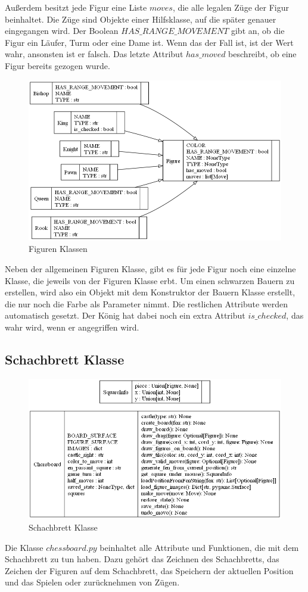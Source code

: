 Außerdem besitzt jede Figur eine Liste \(moves\), die alle legalen Züge der Figur beinhaltet. Die Züge sind Objekte einer Hilfsklasse, auf die später 
genauer eingegangen wird. Der Boolean \(HAS\_RANGE\_MOVEMENT\) gibt an, ob die Figur ein Läufer, Turm oder eine Dame ist. Wenn das der Fall ist,
ist der Wert wahr, ansonsten ist er falsch. Das letzte Attribut \(has\_moved\) beschreibt, ob eine Figur bereits gezogen wurde.
\begin{figure}[ht]
    \centering
    \includegraphics[scale=0.6]{images/classes_figures.png}
    \caption{Figuren Klassen}
\end{figure}
Neben der allgemeinen Figuren Klasse, gibt es für jede Figur noch eine einzelne Klasse, die jeweils von der Figuren Klasse erbt.
Um einen schwarzen Bauern zu erstellen, wird also ein Objekt mit dem Konstruktor der Bauern Klasse erstellt, die nur noch die Farbe als Parameter nimmt.
Die restlichen Attribute werden automatisch gesetzt. Der König hat dabei noch ein extra Attribut \(is\_checked\), das wahr wird, wenn er angegriffen wird.

\subsection{Schachbrett Klasse}
\begin{figure}[ht]
    \centering
    \includegraphics[scale=0.6]{images/classes_chessboard.png}
    \caption{Schachbrett Klasse}
\end{figure}
Die Klasse \(chessboard.py\) beinhaltet alle Attribute und Funktionen, die mit dem Schachbrett zu tun haben. Dazu gehört das Zeichnen des Schachbretts, 
das Zeichen der Figuren auf dem Schachbrett, das Speichern der aktuellen Position und das Spielen oder zurücknehmen von Zügen.

